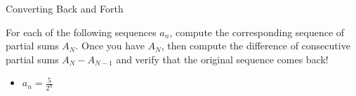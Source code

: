 \begin{exercise}{Converting Back and Forth \Coffeecup \Coffeecup \Coffeecup}

For each of the following sequences $a_n$, compute the corresponding sequence of partial sums $A_N$.  Once you have $A_N$, then compute the difference of consecutive partial sums $A_{N}-A_{N-1}$ and verify that the original sequence comes back!

\begin{itemize}
\item $a_n=\frac{5}{2^n}$
\end{itemize}
\end{exercise}
